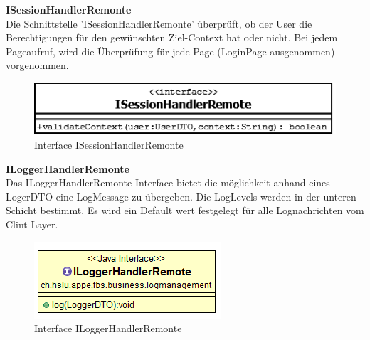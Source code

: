 \textbf{ISessionHandlerRemonte}\\
Die Schnittstelle 'ISessionHandlerRemonte' überprüft, ob der User die Berechtigungen für den gewünschten Ziel-Context hat oder nicht. Bei jedem Pageaufruf, wird die Überprüfung für jede Page (LoginPage ausgenommen) vorgenommen.
\begin{figure}[H]
	\includegraphics[width=0.5\linewidth]{Images/ISessionHandlerRemonte}
	\caption{Interface ISessionHandlerRemonte}
	\label{fig:if-ISessionHandlerRemonte}
\end{figure}

\textbf{ILoggerHandlerRemonte}\\
Das ILoggerHandlerRemonte-Interface bietet die möglichkeit anhand eines LogerDTO eine LogMessage zu übergeben. Die LogLevels werden in der unteren Schicht bestimmt. Es wird ein Default wert festgelegt für alle Lognachrichten vom Clint Layer.
\begin{figure}[H]
	\includegraphics[width=0.5\linewidth]{Images/ILoggerHandlerRemonte}
	\caption{Interface ILoggerHandlerRemonte}
	\label{fig:if-ILoggerHandler}
\end{figure}


